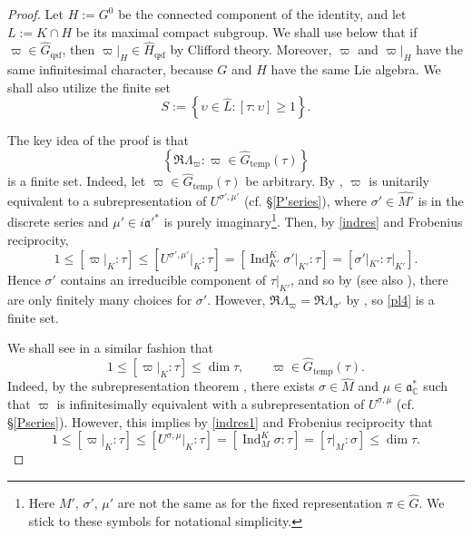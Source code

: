 \documentclass[11pt,oneside]{amsart}
\numberwithin{equation}{section}
\theoremstyle{remark}
\theoremstyle{plain}
\DeclareMathOperator{\Ind}{Ind}
\newcommand\CC{\mathbb{C}}
\newcommand\mfa{\mathfrak{a}}
\renewcommand\leq{\leqslant}
\renewcommand\geq{\geqslant}
\newcommand\Gtemp{\widehat{G}_\mathrm{temp}}
\newcommand\Gqsf{\widehat{G}_\mathrm{qsf}}
\newcommand\GGqsf{\widehat{H}_\mathrm{qsf}}
\begin{document}
\begin{proof} Let $H:=G^0$ be the connected component of the identity, and let $L:=K\cap H$ be its maximal compact subgroup. We shall use below that if $\varpi\in\Gqsf$, then $\varpi|_H\in\GGqsf$ by Clifford theory. Moreover, $\varpi$ and $\varpi|_H$ have the same infinitesimal character, because $G$ and $H$ have the same Lie algebra. We shall also utilize the finite set
\[S:=\left\{\upsilon\in\widehat{L}:[\tau:\upsilon]\geq 1\right\}.\]

The key idea of the proof is that
\begin{equation}\label{pl4}
\left\{\Re\Lambda_\varpi:\varpi\in\Gtemp(\tau)\right\}
\end{equation}
is a finite set. Indeed, let $\varpi\in\Gtemp(\tau)$ be arbitrary. By \cite[Cor.~6.2]{Trombi}, $\varpi$ is unitarily equivalent to a subrepresentation of $U^{\sigma',\mu'}$ (cf. \S\ref{P'series}), where $\sigma'\in\widehat{M'}$ is in the discrete series and $\mu'\in i{\mfa'}^*$ is purely imaginary\footnote{Here $M'$, $\sigma'$, $\mu'$ are not the same as for the fixed representation $\pi\in\widehat{G}$. We stick to these symbols for notational simplicity.}. Then, by \eqref{indres} and Frobenius reciprocity,
\[1\leq[\varpi|_K:\tau]\leq[U^{\sigma',\mu'}|_K:\tau]=[\Ind_{K'}^K\sigma'|_{K'}:\tau]=[\sigma'|_{K'}:\tau|_{K'}].\]
Hence $\sigma'$ contains an irreducible component of $\tau|_{K'}$, and so by \cite[Lem.~70]{HC} (see also \cite[Cor.~12.22]{K}), there are only finitely many choices for $\sigma'$. However, $\Re\Lambda_\varpi=\Re\Lambda_{\sigma'}$ by \cite[Prop.~11.43]{KV}, so \eqref{pl4} is a finite set.

We shall see in a similar fashion that
\begin{equation}\label{multiplicitybound}
1\leq[\varpi|_K:\tau]\leq\dim\tau,\qquad\varpi\in\Gtemp(\tau).\end{equation}
Indeed, by the subrepresentation theorem \cite[Th.~8.21]{CM}, there exists $\sigma\in\widehat{M}$ and $\mu\in\mfa_\CC^*$ such that $\varpi$ is infinitesimally equivalent with a subrepresentation of $U^{\sigma,\mu}$ (cf. \S\ref{Pseries}). However, this implies by \eqref{indres1} and Frobenius reciprocity that
\[1\leq[\varpi|_K:\tau]\leq[U^{\sigma,\mu}|_K:\tau]=[\Ind_M^K\sigma:\tau]=[\tau|_M:\sigma]\leq\dim\tau.\]


\end{proof}
\end{document}
